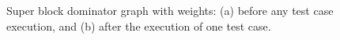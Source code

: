 \begin{figure}[!ht]
\begin{center}
\qquad
{}
\caption{Super block dominator graph with weights: (a) before any
test case execution, and (b) after the execution of one test
case.}\label{fig-weight}
\end{center}
\end{figure}
